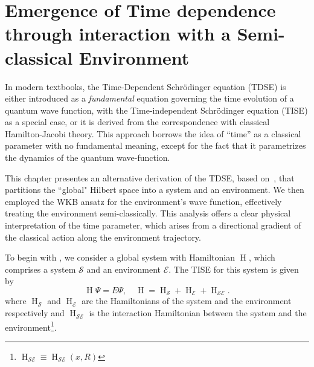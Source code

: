 \chapter[Time Emergence from Quantum-Classical Interactions
]{Emergence of Time dependence 
through interaction with a Semi-classical Environment\label{chap:briggs_rost_semiclassic}}

In modern textbooks, the Time-Dependent Schr\"odinger equation (TDSE) is either introduced as a \emph{fundamental}
equation governing the time evolution of a quantum wave function, with the Time-independent Schr\"odinger
equation (TISE) as a special case, or it is derived from the correspondence with classical Hamilton-Jacobi 
theory. This approach borrows the idea of ``time'' as a classical parameter with no fundamental 
meaning, except for the fact that it parametrizes the dynamics of the quantum wave-function. 

This chapter presentes an alternative derivation of the TDSE, based on~\cite{briggs2001derivation}, that partitions
the ``global" Hilbert space into a system and an environment. We then employed the WKB ansatz 
for the environment's wave function, effectively treating the environment semi-classically. 
This analysis offers a clear physical interpretation of the time parameter, which arises from a directional gradient of 
the classical action along the environment trajectory.

To begin with , we consider a global system with Hamiltonian $\operatorname{H}$, which comprises a system $\mathcal{S}$ and an environment $\mathcal{E}$. 
The TISE for this system is given by
\begin{equation}
\label{eqn:chap2_TISE}
\operatorname{H}\Psi = E\Psi, \quad \operatorname{H} = \operatorname{H}_\mathcal{S} + \operatorname{H}_{\mathcal{E}} + \operatorname{H}_{\mathcal{SE}}.
\end{equation}
where $\operatorname{H}_\mathcal{S}$ and $\operatorname{H}_{\mathcal{E}}$ are the Hamiltonians of the system 
and the environment respectively and $\operatorname{H}_{\mathcal{SE}}$ is the interaction
Hamiltonian between the system and the environment\footnote{$\operatorname{H}_{\mathcal{SE}}\equiv \operatorname{H}_{\mathcal{SE}}(x, R)$}.

